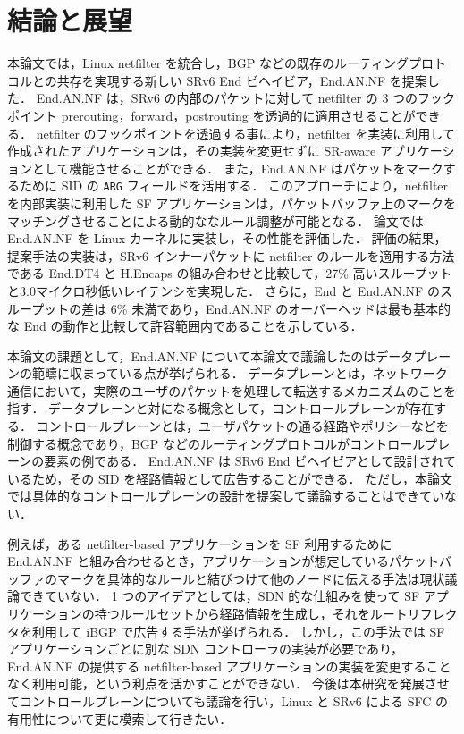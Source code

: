 \chapter{結論と展望}
\label{chap:conclusion}
本論文では，Linux netfilter を統合し，BGP などの既存のルーティングプロトコルとの共存を実現する新しい SRv6 End ビヘイビア，End.AN.NF を提案した．
End.AN.NF は，SRv6 の内部のパケットに対して netfilter の 3 つのフックポイント prerouting，forward，postrouting を透過的に適用させることができる．
netfilter のフックポイントを透過する事により，netfilter を実装に利用して作成されたアプリケーションは，その実装を変更せずに SR-aware アプリケーションとして機能させることができる．
また，End.AN.NF はパケットをマークするために SID の \texttt{ARG} フィールドを活用する．
このアプローチにより，netfilter を内部実装に利用した SF アプリケーションは，パケットバッファ上のマークをマッチングさせることによる動的ななルール調整が可能となる．
論文では End.AN.NF を Linux カーネルに実装し，その性能を評価した．
評価の結果，提案手法の実装は，SRv6 インナーパケットに netfilter のルールを適用する方法である End.DT4 と H.Encaps の組み合わせと比較して，27\% 高いスループットと3.0マイクロ秒低いレイテンシを実現した．
さらに，End と End.AN.NF のスループットの差は 6\% 未満であり，End.AN.NF のオーバーヘッドは最も基本的な End の動作と比較して許容範囲内であることを示している．

本論文の課題として，End.AN.NF について本論文で議論したのはデータプレーンの範疇に収まっている点が挙げられる．
データプレーンとは，ネットワーク通信において，実際のユーザのパケットを処理して転送するメカニズムのことを指す．
データプレーンと対になる概念として，コントロールプレーンが存在する．
コントロールプレーンとは，ユーザパケットの通る経路やポリシーなどを制御する概念であり，BGP などのルーティングプロトコルがコントロールプレーンの要素の例である．
End.AN.NF は SRv6 End ビヘイビアとして設計されているため，その SID を経路情報として広告することができる．
ただし，本論文では具体的なコントロールプレーンの設計を提案して議論することはできていない．

例えば，ある netfilter-based アプリケーションを SF 利用するために End.AN.NF と組み合わせるとき，アプリケーションが想定しているパケットバッファのマークを具体的なルールと結びつけて他のノードに伝える手法は現状議論できていない．
1 つのアイデアとしては，SDN 的な仕組みを使って SF アプリケーションの持つルールセットから経路情報を生成し，それをルートリフレクタを利用して iBGP で広告する手法が挙げられる．
しかし，この手法では SF アプリケーションごとに別な SDN コントローラの実装が必要であり，End.AN.NF の提供する netfilter-based アプリケーションの実装を変更することなく利用可能，という利点を活かすことができない．
今後は本研究を発展させてコントロールプレーンについても議論を行い，Linux と SRv6 による SFC の有用性について更に模索して行きたい．